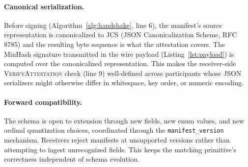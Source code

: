 \documentclass[11pt]{article}
\begin{document}
\paragraph{Canonical serialization.} Before signing (Algorithm~\ref{alg:handshake}, line 6), the manifest's source representation is canonicalized to JCS (JSON Canonicalization Scheme, RFC 8785) and the resulting byte sequence is what the attestation covers. The MinHash signature transmitted in the wire payload (Listing~\ref{lst:payload}) is computed over the canonicalized representation. This makes the receiver-side \textsc{VerifyAttestation} check (line 9) well-defined across participants whose JSON serializers might otherwise differ in whitespace, key order, or numeric encoding.

\paragraph{Forward compatibility.} The schema is open to extension through new fields, new enum values, and new ordinal quantization choices, coordinated through the \texttt{manifest\_version} mechanism. Receivers reject manifests at unsupported versions rather than attempting to ingest unrecognized fields. This keeps the matching primitive's correctness independent of schema evolution.
\end{document}
